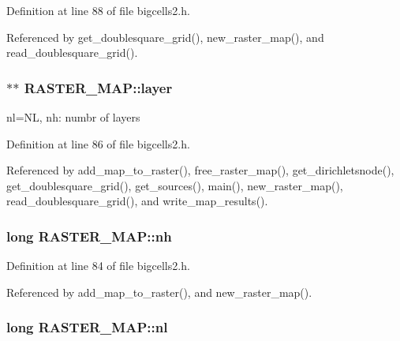 Definition at line 88 of file bigcells2.\-h.



Referenced by get\-\_\-doublesquare\-\_\-grid(), new\-\_\-raster\-\_\-map(), and read\-\_\-doublesquare\-\_\-grid().

\hypertarget{struct_r_a_s_t_e_r___m_a_p_a4e4ca59dd870331996ebb1448ebbd9c8}{
\subsubsection[{layer}]{$\ast$$\ast$ R\-A\-S\-T\-E\-R\-\_\-\-M\-A\-P\-::layer}}\label{struct_r_a_s_t_e_r___m_a_p_a4e4ca59dd870331996ebb1448ebbd9c8}
nl=N\-L, nh\-: numbr of layers 

Definition at line 86 of file bigcells2.\-h.



Referenced by add\-\_\-map\-\_\-to\-\_\-raster(), free\-\_\-raster\-\_\-map(), get\-\_\-dirichletsnode(), get\-\_\-doublesquare\-\_\-grid(), get\-\_\-sources(), main(), new\-\_\-raster\-\_\-map(), read\-\_\-doublesquare\-\_\-grid(), and write\-\_\-map\-\_\-results().

\hypertarget{struct_r_a_s_t_e_r___m_a_p_af7f08052fd9fcde189a18b31a09df627}{
\subsubsection[{nh}]{\setlength{\rightskip}{0pt plus 5cm}long R\-A\-S\-T\-E\-R\-\_\-\-M\-A\-P\-::nh}}\label{struct_r_a_s_t_e_r___m_a_p_af7f08052fd9fcde189a18b31a09df627}


Definition at line 84 of file bigcells2.\-h.



Referenced by add\-\_\-map\-\_\-to\-\_\-raster(), and new\-\_\-raster\-\_\-map().

\hypertarget{struct_r_a_s_t_e_r___m_a_p_ae8f156bbf0bf521a54e26f5d6e15d687}{
\subsubsection[{nl}]{\setlength{\rightskip}{0pt plus 5cm}long R\-A\-S\-T\-E\-R\-\_\-\-M\-A\-P\-::nl}}\label{struct_r_a_s_t_e_r___m_a_p_ae8f156bbf0bf521a54e26f5d6e15d687}


